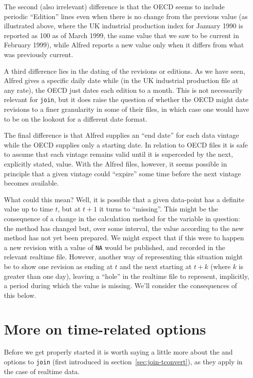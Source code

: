 The second (also irrelevant) difference is that the OECD seems to
include periodic ``Edition'' lines even when there is no change from
the previous value (as illustrated above, where the UK industrial
production index for January 1990 is reported as 100 as of March
1999, the same value that we saw to be current in February 1999),
while Alfred reports a new value only when it differs from what was
previously current.

A third difference lies in the dating of the revisions or editions.
As we have seen, Alfred gives a specific daily date while (in the UK
industrial production file at any rate), the OECD just dates each
edition to a month. This is not necessarily relevant for
\texttt{join}, but it does raise the question of whether the OECD
might date revisions to a finer granularity in some of their files, in
which case one would have to be on the lookout for a different date
format.

The final difference is that Alfred supplies an ``end date'' for each
data vintage while the OECD supplies only a starting date. In relation
to OECD files it is safe to assume that each vintage remains valid
until it is superceded by the next, explicitly stated, value. With the
Alfred files, however, it seems possible in principle that a given
vintage could ``expire'' some time before the next vintage becomes
available.

What could this mean? Well, it is possible that a given data-point has
a definite value up to time $t$, but at $t+1$ it turns to
``missing''. This might be the consequence of a change in the
calculation method for the variable in question: the method has
changed but, over some interval, the value according to the new method
has not yet been prepared. We might expect that if this were to happen
a new revision with a value of \texttt{NA} would be published, and
recorded in the relevant realtime file. However, another way of
representing this situation might be to show one revision as ending at
$t$ and the next starting at $t+k$ (where $k$ is greater than one
day), leaving a ``hole'' in the realtime file to represent,
implicitly, a period during which the value is missing. We'll consider
the consequences of this below.

\section{More on time-related options}
\label{sec:realtime-tconvert}

Before we get properly started it is worth saying a little more about
the  and  options to \texttt{join}
(first introduced in section~\ref{sec:join-tconvert}), as they apply in
the case of realtime data.


